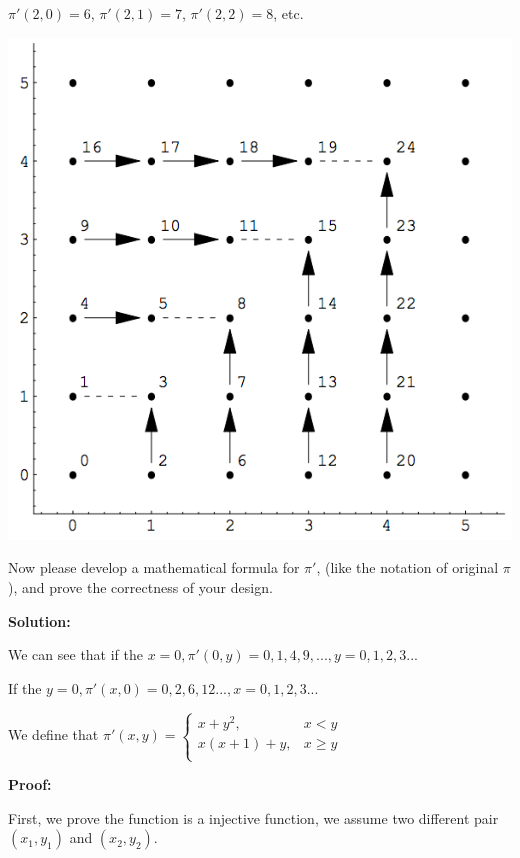 \documentclass[12pt,a4paper]{article}
\theoremstyle{definition}
\numberwithin{equation}{section}
\numberwithin{figure}{section}
\begin{document}
\begin{enumerate}
\begin{minipage}[t]{0.68\linewidth}
    $\pi'(2,0)=6$, $\pi'(2,1)=7$, $\pi'(2,2)=8$, etc.
  \end{minipage}
  \hspace{1mm}
  \begin{minipage}[t]{0.32\linewidth}
  \vspace{0pt}
    \includegraphics[width=\columnwidth]{Fig-Pairing.png}
  \end{minipage}

  Now please develop a mathematical formula for $\pi'$, (like the notation of original $\pi$),  and prove the correctness of your design.

\textbf{Solution:}

We can see that if the $x = 0, \pi'(0,y) = 0,1,4,9,... , y = 0,1,2,3...$

If the $y  = 0, \pi'(x,0) = 0,2,6,12... , x = 0,1,2,3...$

We define that $\pi'(x,y) = \begin{cases}  x+y^2 , &x < y \\ x(x+1)+y , & x \geq y \\ \end{cases} $

\textbf{Proof:}

First, we prove the function is a injective function, we assume two different pair $(x_1, y_1)$ and $(x_2,y_2)$.


\end{enumerate}
\end{document}
